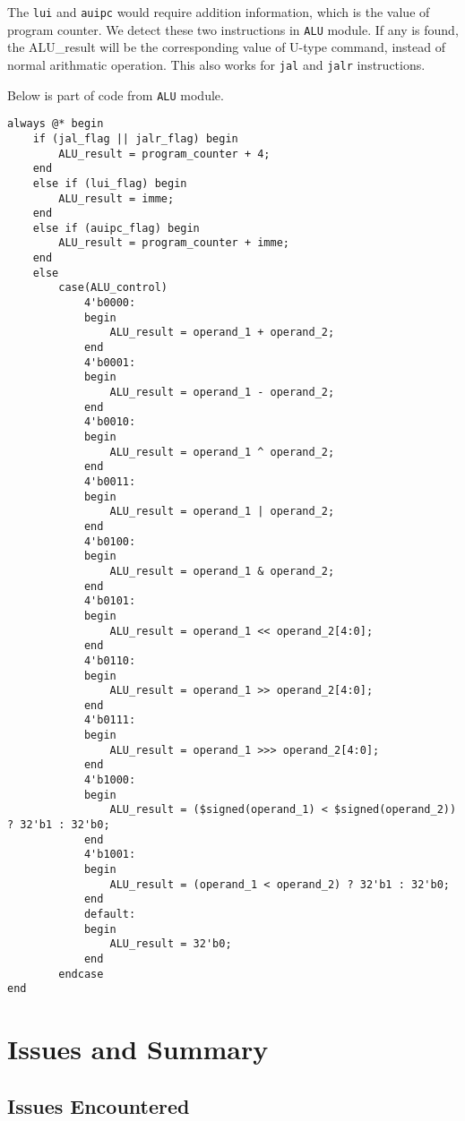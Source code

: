 \documentclass[a4paper,12pt]{article}
\begin{document}
The \texttt{lui} and \texttt{auipc} would require addition information, which is the value of program counter. We detect these two instructions in \texttt{ALU} module. If any is found, the ALU\_result will be the corresponding value of U-type command, instead of normal arithmatic operation. This also works for \texttt{jal} and \texttt{jalr} instructions.

Below is part of code from \texttt{ALU} module.

\begin{verbatim}
always @* begin
    if (jal_flag || jalr_flag) begin
        ALU_result = program_counter + 4;
    end 
    else if (lui_flag) begin
        ALU_result = imme;
    end 
    else if (auipc_flag) begin
        ALU_result = program_counter + imme;
    end 
    else
        case(ALU_control)
            4'b0000:
            begin
                ALU_result = operand_1 + operand_2;
            end
            4'b0001:
            begin
                ALU_result = operand_1 - operand_2;
            end
            4'b0010:
            begin
                ALU_result = operand_1 ^ operand_2;
            end
            4'b0011:
            begin
                ALU_result = operand_1 | operand_2;
            end
            4'b0100:
            begin
                ALU_result = operand_1 & operand_2;
            end
            4'b0101:
            begin
                ALU_result = operand_1 << operand_2[4:0];
            end
            4'b0110:
            begin
                ALU_result = operand_1 >> operand_2[4:0];
            end
            4'b0111:
            begin
                ALU_result = operand_1 >>> operand_2[4:0];
            end
            4'b1000:
            begin
                ALU_result = ($signed(operand_1) < $signed(operand_2)) ? 32'b1 : 32'b0;
            end
            4'b1001:
            begin
                ALU_result = (operand_1 < operand_2) ? 32'b1 : 32'b0;
            end
            default:
            begin
                ALU_result = 32'b0;
            end
        endcase
end
\end{verbatim}

\section{Issues and Summary}

\subsection{Issues Encountered}
\end{document}
